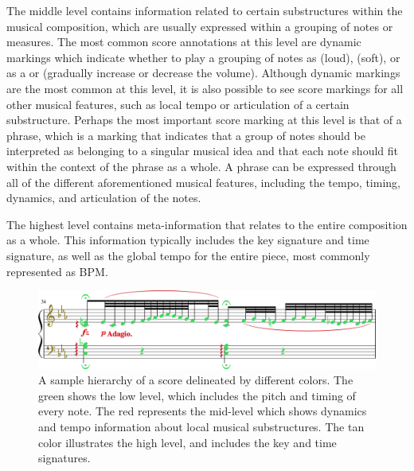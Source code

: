 The middle level contains information related to certain substructures within the musical composition, which are usually expressed within a grouping of notes or measures. The most common score annotations at this level are dynamic markings which indicate whether to play a grouping of notes as  (loud),  (soft), or as a  or  (gradually increase or decrease the volume). %
Although dynamic markings are the most common at this level, it is also possible to see score markings for all other musical features, such as local tempo or articulation of a certain substructure. Perhaps the most important score marking at this level is that of a phrase, which is a marking that indicates that a group of notes should be interpreted as belonging to a singular musical idea and that each note should fit within the context of the phrase as a whole. A phrase can be expressed through all of the different aforementioned musical features, including the tempo, timing, dynamics, and articulation of the notes.

The highest level contains meta-information that relates to the entire composition as a whole. This information typically includes the key signature and time signature, as well as the global tempo for the entire piece, most commonly represented as BPM. 

\begin{figure}
    \centering
    \includegraphics[width=1\linewidth]{figs/ch2/score_hierarchy.jpg}
    \caption{A sample hierarchy of a score delineated by different colors. The green shows the low level, which includes the pitch and timing of every note. The red represents the mid-level which shows dynamics and tempo information about local musical substructures. The tan color illustrates the high level, and includes the key and time signatures.}
    \label{fig:score_hierarchy}
\end{figure}



